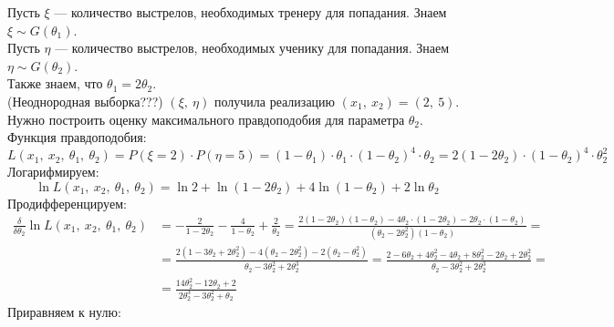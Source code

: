 \documentclass[12pt, a4paper]{article}
\begin{document}
Пусть $\xi$ --- количество выстрелов, необходимых тренеру для попадания. Знаем $\xi \sim G(\theta_1)$.\\
Пусть $\eta$ --- количество выстрелов, необходимых ученику для попадания. Знаем $\eta \sim G(\theta_2)$.\\
Также знаем, что $\theta_1 = 2\theta_2$.\\
(Неоднородная выборка???) $(\xi,\ \eta)$ получила реализацию $(x_1,\ x_2) = (2,\ 5)$. Нужно построить оценку максимального правдоподобия для параметра $\theta_2$.\\

Функция правдоподобия:
\begin{equation*}
    L(x_1,\ x_2,\ \theta_1,\ \theta_2) = P(\xi = 2)\cdot P(\eta = 5) = (1 - \theta_1)\cdot \theta_1 \cdot (1 - \theta_2)^4 \cdot \theta_2 = 2(1 - 2\theta_2)\cdot(1 - \theta_2)^4\cdot\theta_2^2
\end{equation*}
Логарифмируем:
\begin{equation*}
    \ln L(x_1,\ x_2,\ \theta_1,\ \theta_2) = \ln 2 + \ln(1 - 2\theta_2) + 4\ln(1 - \theta_2) + 2\ln \theta_2
\end{equation*}
Продифференцируем:
\begin{equation*}
    \begin{aligned}
        \frac{\delta}{\delta \theta_2} \ln L(x_1,\ x_2,\ \theta_1,\ \theta_2) & = -\frac{2}{1 - 2\theta_2} - \frac{4}{1 - \theta_2} + \frac{2}{\theta_2} = \frac{2(1 - 2\theta_2)(1 - \theta_2) - 4\theta_2 \cdot(1 - 2\theta_2)  -2\theta_2\cdot(1 - \theta_2)}{(\theta_2 - 2\theta^2_2)(1 - \theta_2)} =                                            \\
                                                                              & = \frac{2(1 - 3\theta_2 + 2\theta_2^2) - 4(\theta_2 - 2\theta_2^2) - 2(\theta_2 - \theta_2^2)}{\theta_2 - 3\theta_2^2 + 2\theta_2^3} = \frac{2 - 6\theta_2 + 4\theta_2^2 - 4\theta_2 + 8\theta_2^2 - 2\theta_2 + 2\theta_2^2}{\theta_2 - 3\theta_2^2 + 2\theta_2^3} = \\
                                                                              & = \frac{14\theta_2^2 - 12\theta_2 + 2}{2\theta_2^3 - 3\theta_2^2 + \theta_2}
    \end{aligned}
\end{equation*}
Приравняем к нулю:
\end{document}
